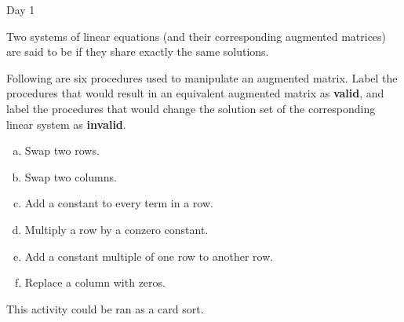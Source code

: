 \begin{applicationActivities}{Day 1}
\begin{definition}
  Two systems of linear equations (and their corresponding augmented
  matrices) are said to be  if they share exactly the
  same solutions.
\end{definition}

\begin{activity}{10}
  Following are six procedures used to manipulate an augmented matrix.
  Label the procedures that would result in an equivalent augmented
  matrix as \textbf{valid}, and label the procedures that would
  change the solution set of the corresponding linear system as
  \textbf{invalid}.
  \begin{multicols}{2}
    \begin{enumerate}[a)]
      \item Swap two rows.
      \item Swap two columns.
      \item Add a constant to every term in a row.
      \item Multiply a row by a conzero constant.
      \item Add a constant multiple of one row to another row.
      \item Replace a column with zeros.
    \end{enumerate}
  \end{multicols}
  \begin{TBLnote}
    This activity could be ran as a card sort.
  \end{TBLnote}
\end{activity}




\end{applicationActivities}

